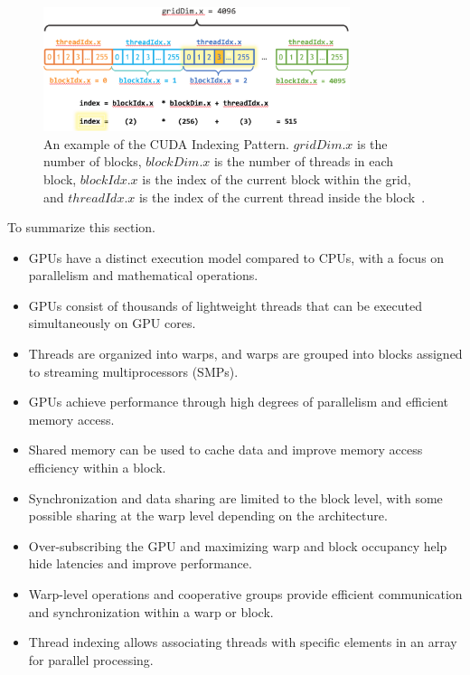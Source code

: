 \begin{figure}[htbp]
\centering\includegraphics[width=0.8\textwidth]{fig_hardware/thread_block_index.png}
\caption{An example of the CUDA Indexing Pattern. $gridDim.x$ is the number of blocks, $blockDim.x$ is the number of threads in each block, $blockIdx.x$ is the index of the current block within the grid, and $threadIdx.x$ is the index of the current thread inside the block~\cite{indexing}.}\label{fig:thread_block_index}
\end{figure}


\par
To summarize this section.
\begin{itemize}
    \item GPUs have a distinct execution model compared to CPUs, with a focus on parallelism and mathematical operations.
    \item GPUs consist of thousands of lightweight threads that can be executed simultaneously on GPU cores.
    \item Threads are organized into warps, and warps are grouped into blocks assigned to streaming multiprocessors (SMPs).
    \item GPUs achieve performance through high degrees of parallelism and efficient memory access.
    \item Shared memory can be used to cache data and improve memory access efficiency within a block.
    \item Synchronization and data sharing are limited to the block level, with some possible sharing at the warp level depending on the architecture.
    \item Over-subscribing the GPU and maximizing warp and block occupancy help hide latencies and improve performance.
    \item Warp-level operations and cooperative groups provide efficient communication and synchronization within a warp or block.
    \item Thread indexing allows associating threads with specific elements in an array for parallel processing.
\end{itemize}



